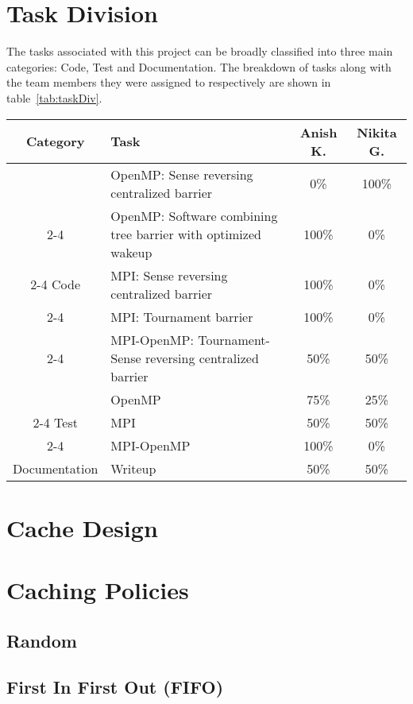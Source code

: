 \documentclass[11pt,pdftex,twocolumn]{article}
\begin{document}
\section{Task Division}
The tasks associated with this project can be broadly classified into three main categories: Code, Test and Documentation. The breakdown of tasks along with the team members they were assigned to respectively are shown in table~\ref{tab:taskDiv}.
\begin{table*}[t]
\centering
\begin{tabular}{| c | p{3.5in} | c | c |}
\hline
Category & Task & Anish K. & Nikita G.\\
\hline\hline
& OpenMP: Sense reversing centralized barrier & 0\% & 100\%\\
\cline{2-4}
& OpenMP: Software combining tree barrier with optimized wakeup & 100\% & 0\%\\
\cline{2-4}
Code & MPI: Sense reversing centralized barrier & 100\% & 0\%\\
\cline{2-4}
& MPI: Tournament barrier & 100\% & 0\%\\
\cline{2-4}
& MPI-OpenMP: Tournament-Sense reversing centralized barrier & 50\% & 50\%\\
\hline
& OpenMP & 75\% & 25\%\\
\cline{2-4}
Test & MPI & 50\% & 50\%\\
\cline{2-4}
& MPI-OpenMP & 100\% & 0\%\\
\hline
Documentation & Writeup & 50\% & 50\%\\
\hline
\end{tabular}
\caption{Task Division for Project 3}
\label{tab:taskDiv}
\end{table*}

\section{Cache Design}
\lipsum

\section{Caching Policies}
\subsection{Random}
\lipsum

\subsection{First In First Out (FIFO)}
\lipsum
\end{document}
